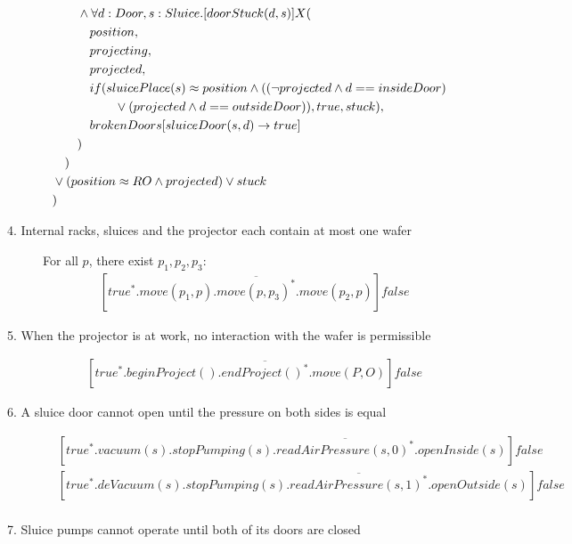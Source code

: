 \begin{description}
\begin{align*}
&  \tab\tab  \wedge \forall d:Door,s:Sluice.[doorStuck(d, s)]X( \\
&  \tab\tab                        \tab                        position, \\
&  \tab\tab                        \tab                        projecting, \\
&  \tab\tab                        \tab                        projected, \\
&  \tab\tab                        \tab                        if(sluicePlace(s) \approx position \wedge ((\neg projected \wedge d == insideDoor) \\
& \tab\tab\tab\tab\tab \vee (projected \wedge d == outsideDoor)), true, stuck), \\
&  \tab\tab                       \tab brokenDoors[sluiceDoor(s,d)\to true] \\
&  \tab\tab                                              ) \\
&  \tab ) \\
&  \vee (position \approx RO \wedge projected) \vee stuck \\
&)
	\end{align*}

 
 \item[4. Internal racks, sluices and the projector each contain at most one wafer]
    
    For all $p$, there exist $p_1, p_2, p_3$:
	\begin{align*}
		&[true^*.move(p_1, p).\overline{move(p,p_3)^*}.move(p_2,p)]false
	\end{align*}

 
 \item[5. When the projector is at work, no interaction with the wafer is permissible]
 	\begin{align*}
 		&[true^*.beginProject().\overline{endProject()^*}.move(P,O)]false
	\end{align*}
	
 \item[6. A sluice door cannot open until the pressure on both sides is equal]
	\begin{align*}
		&[true^*.vacuum(s).stopPumping(s).\overline{readAirPressure(s,0)^*}.openInside(s)]false \\
		&[true^*.deVacuum(s).stopPumping(s).\overline{readAirPressure(s,1)^*}.openOutside(s)]false \\
	\end{align*}
	
 \item[7. Sluice pumps cannot operate until both of its doors are closed]
 

\end{description}
